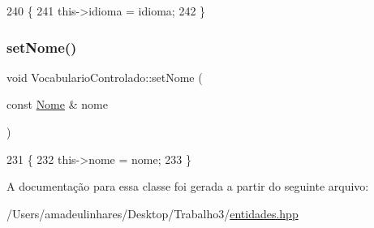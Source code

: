 \begin{DoxyCode}
240   \{
241     this->idioma = idioma;
242   \}
\end{DoxyCode}
\mbox{\label{class_vocabulario_controlado_ad6b399616083d302dc6b4571561dc3a1}} 
\subsubsection{\texorpdfstring{set\+Nome()}{setNome()}}
{\footnotesize\ttfamily void Vocabulario\+Controlado\+::set\+Nome (\begin{DoxyParamCaption}\item[{const \mbox{\hyperlink{class_nome}{Nome}} \&}]{nome }\end{DoxyParamCaption})\hspace{0.3cm}{\ttfamily [inline]}}


\begin{DoxyCode}
231   \{
232     this->nome = nome;
233   \}
\end{DoxyCode}


A documentação para essa classe foi gerada a partir do seguinte arquivo\+:\begin{DoxyCompactItemize}
\item 
/\+Users/amadeulinhares/\+Desktop/\+Trabalho3/\mbox{\hyperlink{entidades_8hpp}{entidades.\+hpp}}\end{DoxyCompactItemize}
